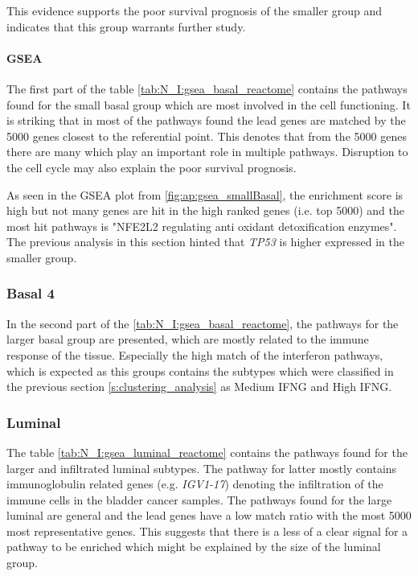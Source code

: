 This evidence supports the poor survival prognosis of the smaller group and indicates that this group warrants further study.

\paragraph*{GSEA}

The first part of the table \cref{tab:N_I:gsea_basal_reactome} contains the pathways found for the small basal group which are most involved in the cell functioning. It is striking that in most of the pathways found the lead genes are matched by the 5000 genes closest to the referential point. This denotes that from the 5000 genes there are many which play an important role in multiple pathways. Disruption to the cell cycle may also explain the poor survival prognosis. 

As seen in the GSEA plot from \cref{fig:ap:gsea_smallBasal}, the enrichment score is high but not many genes are hit in the high ranked genes (i.e. top 5000) and the most hit pathways is "NFE2L2 regulating anti oxidant detoxification enzymes". The previous analysis in this section hinted that \textit{TP53} is higher expressed in the smaller group. 

\subsubsection* {Basal 4}

In the second part of the \cref{tab:N_I:gsea_basal_reactome}, the pathways for the larger basal group are presented, which are mostly related to the immune response of the tissue. Especially the high match of the interferon pathways, which is expected as this groups contains the subtypes which were classified in the previous section \cref{s:clustering_analysis} as Medium IFNG and High IFNG. 


\subsubsection*{Luminal}

The table \cref{tab:N_I:gsea_luminal_reactome} contains the pathways found for the larger and infiltrated luminal subtypes. The pathway for latter mostly contains immunoglobulin related genes (e.g. \textit{IGV1-17}) denoting the infiltration of the immune cells in the bladder cancer samples. The pathways found for the large luminal are general and the lead genes have a low match ratio with the most 5000 most representative genes. This suggests that there is a less of a clear signal for a pathway to be enriched which might be explained by the size of the luminal group. 

